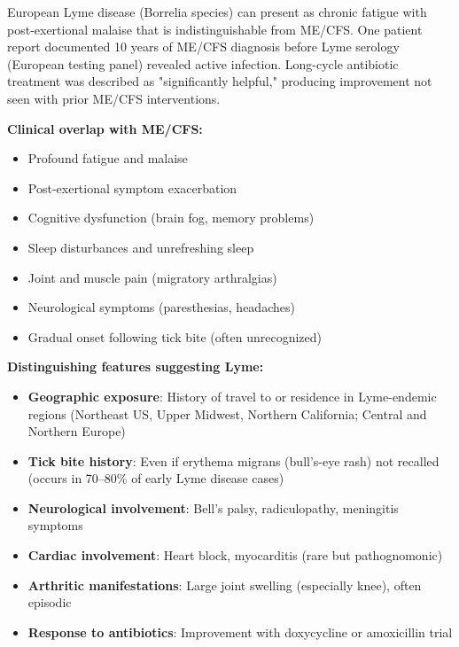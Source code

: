 \begin{observation}
\label{obs:lyme-mecfs-overlap}
European Lyme disease (Borrelia species) can present as chronic fatigue with post-exertional malaise that is indistinguishable from ME/CFS. One patient report documented 10 years of ME/CFS diagnosis before Lyme serology (European testing panel) revealed active infection. Long-cycle antibiotic treatment was described as "significantly helpful," producing improvement not seen with prior ME/CFS interventions.

\textbf{Clinical overlap with ME/CFS:}
\begin{itemize}
    \item Profound fatigue and malaise
    \item Post-exertional symptom exacerbation
    \item Cognitive dysfunction (brain fog, memory problems)
    \item Sleep disturbances and unrefreshing sleep
    \item Joint and muscle pain (migratory arthralgias)
    \item Neurological symptoms (paresthesias, headaches)
    \item Gradual onset following tick bite (often unrecognized)
\end{itemize}

\textbf{Distinguishing features suggesting Lyme:}
\begin{itemize}
    \item \textbf{Geographic exposure}: History of travel to or residence in Lyme-endemic regions (Northeast US, Upper Midwest, Northern California; Central and Northern Europe)
    \item \textbf{Tick bite history}: Even if erythema migrans (bull's-eye rash) not recalled (occurs in 70--80\% of early Lyme disease cases)
    \item \textbf{Neurological involvement}: Bell's palsy, radiculopathy, meningitis symptoms
    \item \textbf{Cardiac involvement}: Heart block, myocarditis (rare but pathognomonic)
    \item \textbf{Arthritic manifestations}: Large joint swelling (especially knee), often episodic
    \item \textbf{Response to antibiotics}: Improvement with doxycycline or amoxicillin trial
\end{itemize}


\end{observation}

